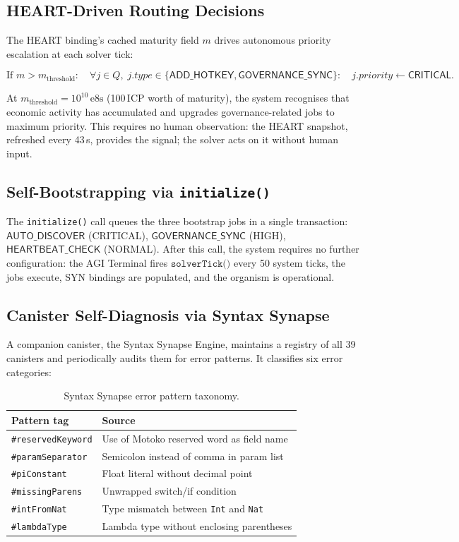 \documentclass[12pt]{article}
\begin{document}
\subsection{HEART-Driven Routing Decisions}

The HEART binding's cached maturity field $m$ drives autonomous priority
escalation at each solver tick:

\[
  \text{If } m > m_\text{threshold}:
  \quad \forall j \in Q,\; j.\mathit{type} \in \{\mathsf{ADD\_HOTKEY},
  \mathsf{GOVERNANCE\_SYNC}\}:
  \quad j.\mathit{priority} \gets \mathsf{CRITICAL}.
\]

At $m_\text{threshold} = 10^{10}\,\text{e8s}$ (100\,ICP worth of maturity),
the system recognises that economic activity has accumulated and upgrades
governance-related jobs to maximum priority.  This requires no human
observation: the HEART snapshot, refreshed every 43\,s, provides the signal;
the solver acts on it without human input.

\subsection{Self-Bootstrapping via \texttt{initialize()}}

The \texttt{initialize()} call queues the three bootstrap jobs in a single
transaction:
$\mathsf{AUTO\_DISCOVER}$ (CRITICAL),
$\mathsf{GOVERNANCE\_SYNC}$ (HIGH),
$\mathsf{HEARTBEAT\_CHECK}$ (NORMAL).
After this call, the system requires no further configuration: the AGI Terminal
fires $\texttt{solverTick()}$ every 50 system ticks, the jobs execute, SYN
bindings are populated, and the organism is operational.

\subsection{Canister Self-Diagnosis via Syntax Synapse}

A companion canister, the Syntax Synapse Engine, maintains a registry of all 39
canisters and periodically audits them for error patterns.  It classifies six
error categories:

\begin{table}[h]
  \centering
  \caption{Syntax Synapse error pattern taxonomy.}
  \label{tab:synapse}
  \begin{tabular}{ll}
    \toprule
    Pattern tag & Source \\
    \midrule
    \texttt{\#reservedKeyword}    & Use of Motoko reserved word as field name \\
    \texttt{\#paramSeparator}     & Semicolon instead of comma in param list \\
    \texttt{\#piConstant}         & Float literal without decimal point \\
    \texttt{\#missingParens}      & Unwrapped switch/if condition \\
    \texttt{\#intFromNat}         & Type mismatch between \texttt{Int} and \texttt{Nat} \\
    \texttt{\#lambdaType}         & Lambda type without enclosing parentheses \\
    \bottomrule
  \end{tabular}
\end{table}
\end{document}
